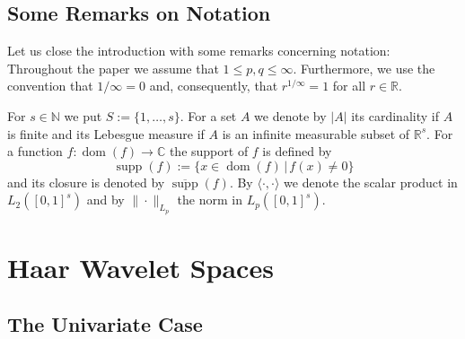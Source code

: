 \documentclass[12pt]{article}
\DeclareMathOperator{\supp}{supp}
\DeclareMathOperator{\dom}{dom}
\newcommand{\RR}{\mathbb{R}}
\newcommand{\N}{\mathbb{N}}
\newcommand{\C}{\mathbb{C}}
\begin{document}

\subsection{Some Remarks on Notation}

Let us close the introduction with some remarks concerning notation:
Throughout the paper we assume that $1 \le p, q \le \infty$. 
Furthermore, we use the convention that $1/\infty = 0$ and, consequently, that $r^{1/\infty} = 1$ for all $r\in \RR$.

For $s\in \N$ we put $S:= \{1,\ldots, s\}$. For a set $A$ we denote by $|A|$ its cardinality if $A$ is finite and its Lebesgue measure if $A$ is an infinite measurable subset of $\RR^s$. For a function $f: \dom(f) \to \C$  the support of $f$ is defined by
\begin{equation*}
\supp(f) := \{ x\in \dom(f) \,|\, f(x) \neq 0\}
\end{equation*}
and its closure is denoted by $\overline{\supp}(f)$.  By $\langle \cdot, \cdot \rangle$ we denote the scalar product in $L_2([0,1]^s)$ and by $\|\cdot\|_{L_p}$ the norm in $L_p([0,1]^s)$. 


\section{Haar Wavelet Spaces}
\label{Sec:Haar}


\subsection{The Univariate Case}
\label{HAAR-1}
\end{document}
